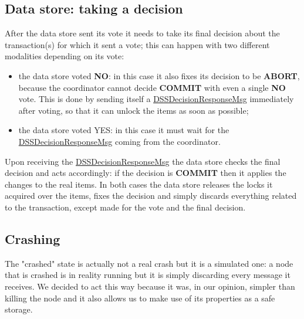 \subsection{Data store: taking a decision}
After the data store sent its vote it needs to take its final decision about the transaction(s) for which it sent a vote; this can happen with two different modalities depending on its vote:
\begin{itemize}
    \item the data store voted \textbf{NO}: in this case it also fixes its decision to be \textbf{ABORT}, because the coordinator cannot decide \textbf{COMMIT} with even a single \textbf{NO} vote. This is done by sending itself a \url{DSSDecisionResponseMsg} immediately after voting, so that it can unlock the items as soon as possible;
    \item the data store voted YES: in this case it must wait for the \url{DSSDecisionResponseMsg} coming from the coordinator.
\end{itemize}
Upon receiving the \url{DSSDecisionResponseMsg} the data store checks the final decision and acts accordingly: if the decision is \textbf{COMMIT} then it applies the changes to the real items.
In both cases the data store releases the locks it acquired over the items, fixes the decision and simply discards everything related to the transaction, except made for the vote and the final decision.
\subsection{Crashing}
The "crashed" state is actually not a real crash but it is a simulated one: a node that is crashed is in reality running but it is simply discarding every message it receives. We decided to act this way because it was, in our opinion, simpler than killing the node and it also allows us to make use of its properties as a safe storage.